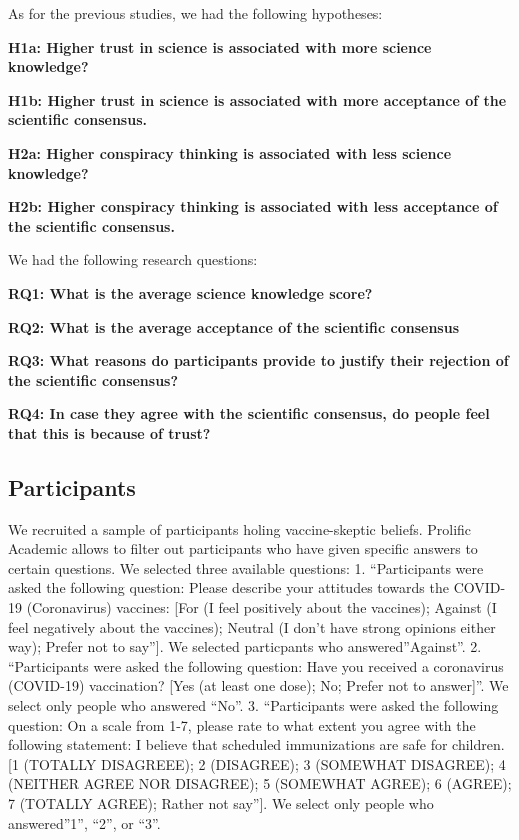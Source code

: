 \documentclass[
  doc,floatsintext]{apa6}
\begin{document}
As for the previous studies, we had the following hypotheses:

\textbf{H1a: Higher trust in science is associated with more science knowledge?}

\textbf{H1b: Higher trust in science is associated with more acceptance of the scientific consensus.}

\textbf{H2a: Higher conspiracy thinking is associated with less science knowledge?}

\textbf{H2b: Higher conspiracy thinking is associated with less acceptance of the scientific consensus.}

We had the following research questions:

\textbf{RQ1: What is the average science knowledge score?}

\textbf{RQ2: What is the average acceptance of the scientific consensus}

\textbf{RQ3: What reasons do participants provide to justify their rejection of the scientific consensus?}

\textbf{RQ4: In case they agree with the scientific consensus, do people feel that this is because of trust?}

\subsection{Participants}\label{participants-4}

We recruited a sample of participants holing vaccine-skeptic beliefs. Prolific Academic allows to filter out participants who have given specific answers to certain questions. We selected three available questions: 1. ``Participants were asked the following question: Please describe your attitudes towards the COVID-19 (Coronavirus) vaccines: {[}For (I feel positively about the vaccines); Against (I feel negatively about the vaccines); Neutral (I don't have strong opinions either way); Prefer not to say''{]}. We selected particpants who answered''Against''. 2. ``Participants were asked the following question: Have you received a coronavirus (COVID-19) vaccination? {[}Yes (at least one dose); No; Prefer not to answer{]}''. We select only people who answered ``No''. 3. ``Participants were asked the following question: On a scale from 1-7, please rate to what extent you agree with the following statement: I believe that scheduled immunizations are safe for children. {[}1 (TOTALLY DISAGREEE); 2 (DISAGREE); 3 (SOMEWHAT DISAGREE); 4 (NEITHER AGREE NOR DISAGREE); 5 (SOMEWHAT AGREE); 6 (AGREE); 7 (TOTALLY AGREE); Rather not say''{]}. We select only people who answered''1'', ``2'', or ``3''.
\end{document}
